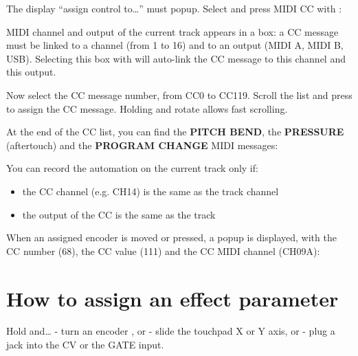 The display ``assign control to\ldots'' must popup. Select and press MIDI CC with \encodericon{}:


MIDI channel and output of the current track appears in a box: a CC message must be linked to a channel (from 1 to 16) and to an output (MIDI A, MIDI B, USB). Selecting this box with \encodericon{} will auto-link the CC message to this channel and this output.


Now select the CC message number, from CC0 to CC119. Scroll the list and press \encodericon{} to assign the CC message. Holding  and rotate \encodericon{} allows fast scrolling.


At the end of the CC list, you can find the \textbf{PITCH BEND}, the \textbf{PRESSURE} (aftertouch) and the \textbf{PROGRAM CHANGE} MIDI messages:


You can record the automation on the current track only if:
\begin{itemize}
\item the CC channel (e.g. CH14) is the same as the track channel
\item the output of the CC is the same as the track
\end{itemize}


When an assigned encoder is moved or pressed, a popup is displayed, with the CC number (68), the CC value (111) and the CC MIDI channel (CH09A):


\section{How to assign an effect parameter}

Hold  and\ldots
- turn an encoder \encodersicon{}, or
- slide the touchpad \touchpadicon{} X or Y axis, or
- plug a jack into the CV or the GATE input.

